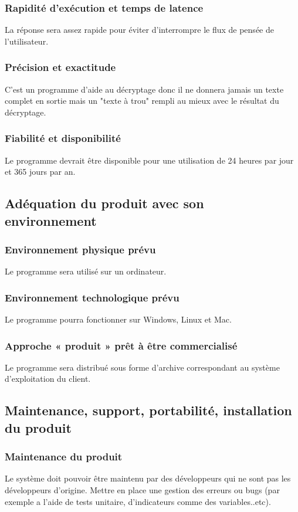 \documentclass[a4]{article}
\begin{document}
			\subsubsection {Rapidité d’exécution et temps de latence}
				La réponse sera assez rapide pour éviter d’interrompre le flux de pensée de l’utilisateur.

			\subsubsection {Précision et exactitude}
				C'est un programme d'aide au décryptage donc il ne donnera jamais un texte complet en sortie 					mais un "texte à trou" rempli au mieux avec le résultat du décryptage.
			\subsubsection {Fiabilité et disponibilité}
				Le programme devrait être disponible pour une utilisation de 24 heures par jour et 365 jours
				par an. 

		\subsection{Adéquation du produit avec son environnement}
			\subsubsection {Environnement physique prévu}
				Le programme sera utilisé sur un ordinateur.
			\subsubsection {Environnement technologique prévu}
				Le programme pourra fonctionner sur Windows, Linux et Mac.
			\subsubsection {Approche « produit » prêt à être commercialisé}
					Le programme sera distribué sous forme d'archive correspondant au système 						d'exploitation du client.
		\subsection{Maintenance, support, portabilité, installation du produit}
			\subsubsection {Maintenance du produit}
				Le système doit pouvoir être maintenu par des développeurs qui ne sont pas les
				développeurs d’origine.
				Mettre en place une gestion des erreurs ou bugs (par exemple a l'aide de tests unitaire, 				d'indicateurs comme des variables..etc).
\end{document}
